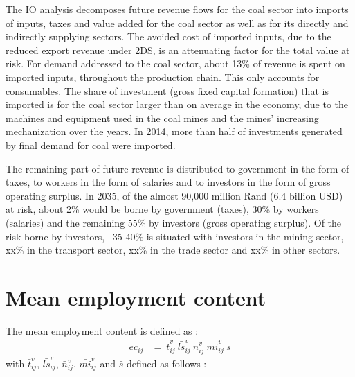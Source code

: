 \documentclass[12pt,english]{article}
\begin{document}
The IO analysis decomposes future revenue flows for the coal sector into imports of inputs, taxes and value added for the coal sector as well as for its directly and indirectly supplying sectors. The avoided cost of imported inputs, due to the reduced export revenue under 2DS, is an attenuating factor for the total value at risk. For demand addressed to the coal sector, about 13\% of revenue is spent on imported inputs, throughout the production chain. This only accounts for consumables. The share of investment (gross fixed capital formation) that is imported is for the coal sector larger than on average in the economy, due to the machines and equipment used in the coal mines and the mines' increasing mechanization over the years. In 2014, more than half of investments generated by final demand for coal were imported. %

The remaining part of future revenue is distributed to government in the form of taxes, to workers in the form of salaries and to investors in the form of gross operating surplus. In 2035, of the almost 90,000 million Rand (6.4 billion USD) at risk, about 2\% would be borne by government (taxes), 30\% by workers (salaries) and the remaining 55\% by investors (gross operating surplus). Of the risk borne by investors, ~35-40\% is situated with investors in the mining sector, xx\% in the transport sector, xx\% in the trade sector and xx\% in other sectors.


\clearpage

\newpage


\clearpage

\appendix

\section{Mean employment content} \label{ECmean}

The mean employment content is defined as :
\begin{align}
\bar{ec}_{ij} &=  \ \bar{t}^v_{ij} \ \bar{ls}^v_{ij} \ \bar{n}^v_{ij} \ \bar{mi}^v_{ij}  \ \bar{s} \nonumber
\end{align}
with $\bar{t}^v_{ij}$, $\bar{ls}^v_{ij}$, $\bar{n}^v_{ij}$, $\bar{mi}^v_{ij}$ and $\bar{s}$ defined as follows :
\end{document}
